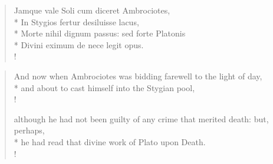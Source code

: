 \begin{latin}
\begin{verse}%
Jamque vale Soli cum diceret Ambrociotes,\\*
In Stygios fertur desiluisse lacus,\\*
Morte nihil dignum passus: sed forte Platonis\\*
Divini eximum de nece legit opus.\\!
\end{verse}%
\end{latin}
\translationrule%
\begin{verse}%
And now when Ambrociotes was bidding farewell to the light of day,\\*
and about to cast himself into the Stygian pool,\\!

although he had not been guilty of any crime that merited death: but, perhaps,\\*
he had read that divine work of Plato upon Death.\\!
\end{verse}%
%

